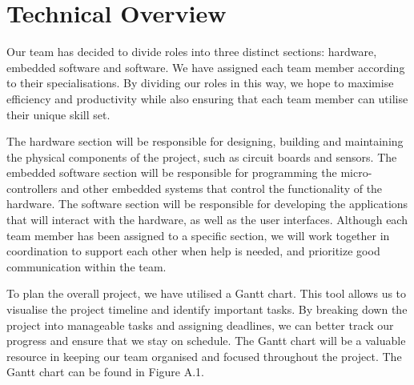 
\chapter{Technical Overview}

\par Our team has decided to divide roles into three distinct sections: hardware, embedded software and software. We have assigned each team member according to their specialisations. By dividing our roles in this way, we hope to maximise efficiency and productivity while also ensuring that each team member can utilise their unique skill set. 

The hardware section will be responsible for designing, building and maintaining the physical components of the project, such as circuit boards and sensors. The embedded software section will be responsible for programming the micro-controllers and other embedded systems that control the functionality of the hardware. The software section will be responsible for developing the applications that will interact with the hardware, as well as the user interfaces. Although each team member has been assigned to a specific section, we will work together in coordination to support each other when help is needed, and prioritize good communication within the team.

To plan the overall project, we have utilised a Gantt chart. This tool allows us to visualise the project timeline and identify important tasks. By breaking down the project into manageable tasks and assigning deadlines, we can better track our progress and ensure that we stay on schedule. The Gantt chart will be a valuable resource in keeping our team organised and focused throughout the project. The Gantt chart can be found in Figure A.1.


